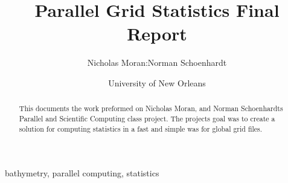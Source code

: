 \documentclass[letterpaper,twocolumn,10pt]{article}
\author{Nicholas Moran:Norman Schoenhardt}
\date{University of New Orleans}
\begin{document}
    \title{Parallel Grid Statistics Final Report}




















    \maketitle



    \begin{abstract}
        This documents the work preformed on Nicholas Moran, and Norman Schoenhardts Parallel and Scientific Computing class project.
        The projects goal was to create a solution for computing statistics in a fast and simple was for global grid files.

    \end{abstract}



    \begin{IEEEkeywords}

        bathymetry, parallel computing, statistics

    \end{IEEEkeywords}


    
    
    
    
    
    
    
\end{document}
